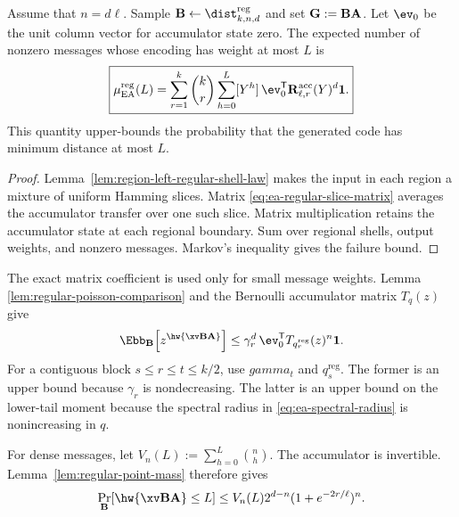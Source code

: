 \begin{theorem}
\label{thm:ea-regular-first-moment}
Assume that $n=d\ell$.  Sample
$\B\gets\dist^{\mathrm{reg}}_{k,n,d}$ and set $\mathbf G:=\mathbf B\mathbf A$.  Let $\ev_0$ be
the unit column vector for accumulator state zero.  The expected number of
nonzero messages whose encoding has weight at most $L$ is
\begin{equation}
 \boxed{
 \mu_{\mathrm{EA}}^{\mathrm{reg}}(L)
 =\sum_{r=1}^{k}\binom{k}{r}\sum_{h=0}^{L}[Y^h]\,
   \ev_0^\mathsf{T}
   \mathbf R^{\mathrm{acc}}_{\ell,r}(Y)^d\boldsymbol{1}.
 }
 \label{eq:ea-regular-first-moment}
\end{equation}
This quantity upper-bounds the probability that the generated code has
minimum distance at most $L$.
\end{theorem}

\begin{proof}
Lemma~\ref{lem:region-left-regular-shell-law} makes the input in each region a
mixture of uniform Hamming slices.  Matrix
\eqref{eq:ea-regular-slice-matrix} averages the accumulator transfer over one
such slice.  Matrix multiplication retains the accumulator state at each
regional boundary.  Sum over regional shells, output weights, and nonzero
messages.  Markov's inequality gives the failure bound.
\end{proof}

The exact matrix coefficient is used only for small message weights.  Lemma
\ref{lem:regular-poisson-comparison} and the Bernoulli accumulator matrix
$T_q(z)$ give
\begin{equation}
 \Ebb_{\B}\!\left[z^{\hw{\xv\B\A}}\right]
 \leq\gamma_r^d\,
 \ev_0^\mathsf{T}T_{q^{\mathrm{reg}}_r}(z)^n\boldsymbol{1}.
 \label{eq:ea-regular-poisson-mgf}
\end{equation}
For a contiguous block $s\leq r\leq t\leq k/2$, use $gamma_t$ and
$q^{\mathrm{reg}}_s$.  The former is an upper bound because $\gamma_r$ is
nondecreasing.  The latter is an upper bound on the lower-tail moment because
the spectral radius in \eqref{eq:ea-spectral-radius} is nonincreasing in $q$.

For dense messages, let $V_n(L):=\sum_{h=0}^{L}\binom{n}{h}$.  The accumulator
is invertible.  Lemma~\ref{lem:regular-point-mass} therefore gives
\begin{equation}
 \Pr_{\B}[\hw{\xv\B\A}\leq L]
 \leq V_n(L)2^{d-n}(1+e^{-2r/\ell})^n.
 \label{eq:ea-regular-dense-bound}
\end{equation}

